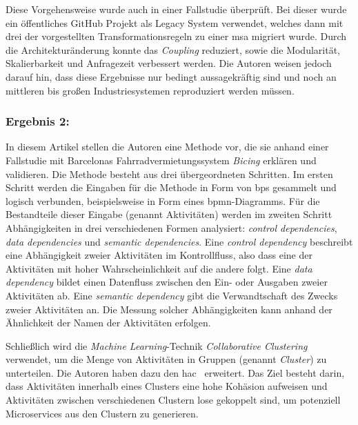 Diese Vorgehensweise wurde auch in einer Fallstudie überprüft.
Bei dieser wurde ein öffentliches GitHub Projekt als Legacy System verwendet, welches dann mit drei der vorgestellten Trans\-for\-ma\-tions\-regeln zu einer \gls{msa} migriert wurde.
Durch die Architekturänderung konnte das \emph{Coupling} reduziert, sowie die Modularität, Skalierbarkeit und Anfragezeit verbessert werden.
Die Autoren weisen jedoch darauf hin, dass diese Ergebnisse nur bedingt aussagekräftig sind und noch an mittleren bis großen Industriesystemen reproduziert werden müssen.


\subsubsection{Ergebnis 2:  \cite{arh-result-no-filter-3}}

In diesem Artikel stellen die Autoren eine Methode vor, die sie anhand einer Fallstudie mit Barcelonas Fahrradvermietungssystem \emph{Bicing} erklären und validieren.
Die Methode besteht aus drei übergeordneten Schritten.
Im ersten Schritt werden die Eingaben für die Methode in Form von \glspl{bp} gesammelt und logisch verbunden, beispielsweise in Form eines \gls{bpmn}-Diagramms.
Für die Bestandteile dieser Eingabe (genannt Aktivitäten) werden im zweiten Schritt Abhängigkeiten in drei verschiedenen Formen analysiert: \emph{control dependencies}, \emph{data dependencies} und \emph{semantic dependencies}.
Eine \emph{control dependency} beschreibt eine Abhängigkeit zweier Aktivitäten im Kontrollfluss, also dass eine der Aktivitäten mit hoher Wahrscheinlichkeit auf die andere folgt.
Eine \emph{data dependency} bildet einen Datenfluss zwischen den Ein- oder Ausgaben zweier Aktivitäten ab.
Eine \emph{semantic dependency} gibt die Verwandtschaft des Zwecks zweier Aktivitäten an.
Die Messung solcher Abhängigkeiten kann anhand der Ähnlichkeit der Namen der Aktivitäten erfolgen.

Schließlich wird die \emph{Machine Learning}-Technik \emph{Collaborative Clustering} verwendet, um die Menge von Aktivitäten in Gruppen (genannt \emph{Cluster}) zu unterteilen.
Die Autoren haben dazu den \gls{hac}~\cite{hierarchical-agglomerative-algorithm} erweitert.
Das Ziel besteht darin, dass Aktivitäten innerhalb eines Clusters eine hohe Kohäsion aufweisen und Aktivitäten zwischen verschiedenen Clustern lose gekoppelt sind, um potenziell Microservices aus den Clustern zu generieren.

